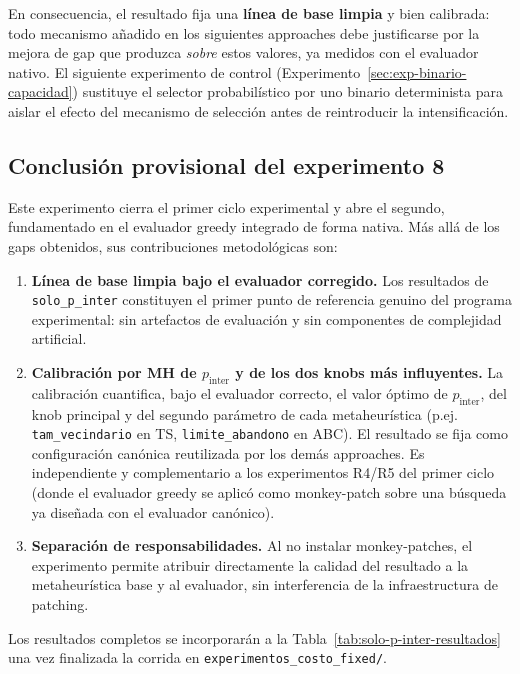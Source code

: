 En consecuencia, el resultado fija una \textbf{línea de base limpia} y bien
calibrada: todo mecanismo añadido en los siguientes approaches debe justificarse
por la mejora de gap que produzca \emph{sobre} estos valores, ya
medidos con el evaluador nativo. El siguiente experimento de control
(Experimento~\ref{sec:exp-binario-capacidad}) sustituye el selector
probabilístico por uno binario determinista para aislar el efecto del
mecanismo de selección antes de reintroducir la intensificación.

\subsection{Conclusión provisional del experimento 8}

Este experimento cierra el primer ciclo experimental y abre el segundo,
fundamentado en el evaluador greedy integrado de forma nativa. Más allá de los
gaps obtenidos, sus contribuciones metodológicas son:

\begin{enumerate}
\item \textbf{Línea de base limpia bajo el evaluador corregido.}
  Los resultados de \texttt{solo\_p\_inter} constituyen el primer
  punto de referencia genuino del programa experimental: sin artefactos
  de evaluación y sin componentes de complejidad artificial.
\item \textbf{Calibración por MH de $p_{\text{inter}}$ y de los dos knobs
  más influyentes.} La calibración cuantifica, bajo el evaluador correcto,
  el valor óptimo de $p_{\text{inter}}$, del knob principal y del segundo
  parámetro de cada metaheurística (p.ej. \texttt{tam\_vecindario} en TS,
  \texttt{limite\_abandono} en ABC). El resultado se fija como configuración
  canónica reutilizada por los demás approaches. Es independiente y
  complementario a los experimentos R4/R5 del primer ciclo (donde el evaluador
  greedy se aplicó como monkey-patch sobre una búsqueda ya diseñada con el
  evaluador canónico).
\item \textbf{Separación de responsabilidades.}
  Al no instalar monkey-patches, el experimento permite atribuir
  directamente la calidad del resultado a la metaheurística base y al
  evaluador, sin interferencia de la infraestructura de patching.
\end{enumerate}

Los resultados completos se incorporarán a la
Tabla~\ref{tab:solo-p-inter-resultados} una vez finalizada la corrida
en \texttt{experimentos\_costo\_fixed/}.
